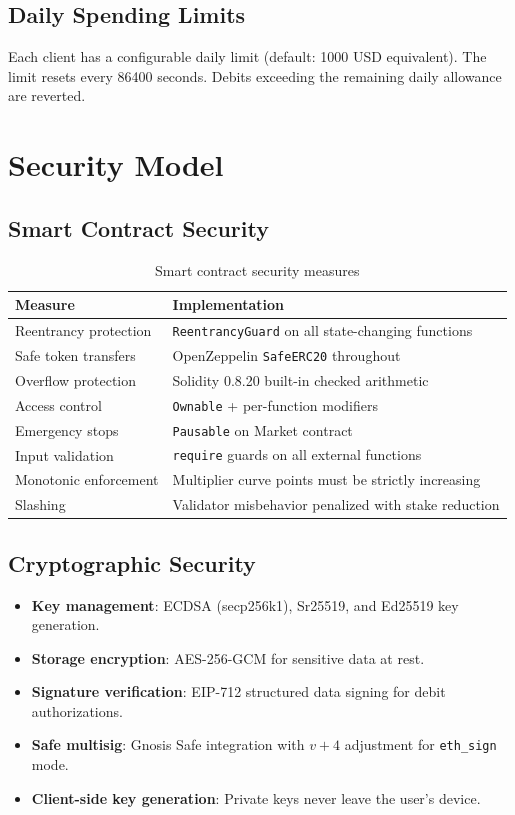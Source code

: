\documentclass[11pt,a4paper]{article}
\begin{document}
\subsection{Daily Spending Limits}

Each client has a configurable daily limit (default: 1000 USD equivalent). The limit resets every 86400 seconds. Debits exceeding the remaining daily allowance are reverted.

\section{Security Model}
\label{sec:security}

\subsection{Smart Contract Security}

\begin{table}[H]
\centering
\begin{tabularx}{\textwidth}{lX}
\toprule
\textbf{Measure} & \textbf{Implementation} \\
\midrule
Reentrancy protection & \texttt{ReentrancyGuard} on all state-changing functions \\
Safe token transfers & OpenZeppelin \texttt{SafeERC20} throughout \\
Overflow protection & Solidity 0.8.20 built-in checked arithmetic \\
Access control & \texttt{Ownable} + per-function modifiers \\
Emergency stops & \texttt{Pausable} on Market contract \\
Input validation & \texttt{require} guards on all external functions \\
Monotonic enforcement & Multiplier curve points must be strictly increasing \\
Slashing & Validator misbehavior penalized with stake reduction \\
\bottomrule
\end{tabularx}
\caption{Smart contract security measures}
\end{table}

\subsection{Cryptographic Security}

\begin{itemize}
    \item \textbf{Key management}: ECDSA (secp256k1), Sr25519, and Ed25519 key generation.
    \item \textbf{Storage encryption}: AES-256-GCM for sensitive data at rest.
    \item \textbf{Signature verification}: EIP-712 structured data signing for debit authorizations.
    \item \textbf{Safe multisig}: Gnosis Safe integration with $v + 4$ adjustment for \texttt{eth\_sign} mode.
    \item \textbf{Client-side key generation}: Private keys never leave the user's device.
\end{itemize}
\end{document}
